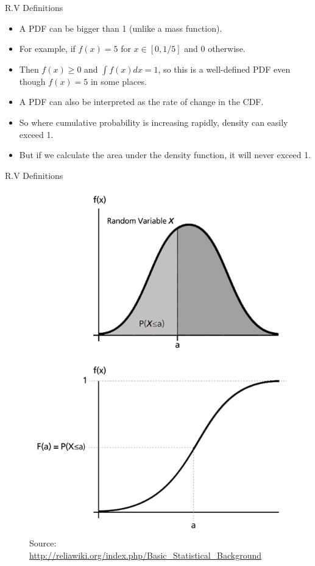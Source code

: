 \documentclass[handout]{beamer}
\begin{document}
\begin{frame}{R.V Definitions}
\scriptsize{
\begin{itemize}
\item A PDF can be bigger than 1 (unlike a mass function). 
\item For example, if $f(x) = 5$ for $x \in  [0,1/5]$ and $0$ otherwise.
\item Then $f(x) \geq 0$ and $\int f(x)dx = 1$, so this is a well-defined PDF even though $f(x) = 5$ in some places.
\item A PDF can also be interpreted as the rate of change in the CDF. 
\item So where cumulative probability is increasing rapidly, density can easily exceed 1. 
\item But if we calculate the area under the density function, it will never exceed 1. 
 
\end{itemize}




}
\end{frame}


\begin{frame}{R.V Definitions}

\begin{figure}[h!]
	\centering
	\includegraphics[scale=1.1]{pics/pdfcdf.png}
	\caption{Source: \url{http://reliawiki.org/index.php/Basic_Statistical_Background}}
\end{figure}



\end{frame}
\end{document}
